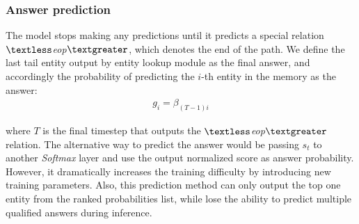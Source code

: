 \subsubsection{Answer prediction} The model stops making any predictions until it predicts a special relation \textit{$\textless$eop$\textgreater$}, which denotes the end of the path. We define the last tail entity output by entity lookup module as the final answer, and accordingly the probability of predicting the $i$-th entity in the memory as the answer:
\begin{align}
g_i = \beta_{(T-1)i}
\label{eq:e_prob}
\end{align}

where $T$ is the final timestep that outputs the \textit{$\textless$eop$\textgreater$} relation. The alternative way to predict the answer would be passing $s_t$ to another \textit{Softmax} layer and use the output normalized score as answer probability. However, it dramatically increases the training difficulty by introducing new training parameters. Also, this prediction method can only output the top one entity from the ranked probabilities list, while lose the ability to predict multiple qualified answers during inference. 